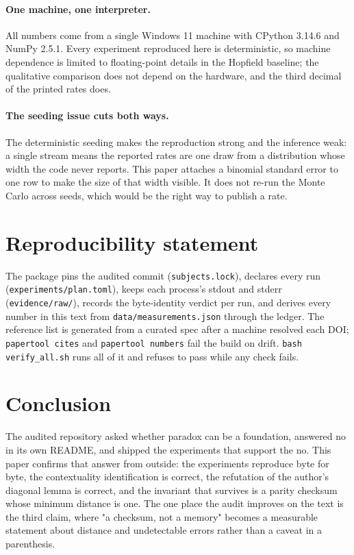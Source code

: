 \documentclass[11pt,a4paper]{article}
\begin{document}
\paragraph{One machine, one interpreter.} All numbers come from a single Windows 11 machine with
CPython 3.14.6 and NumPy 2.5.1. Every experiment reproduced here is deterministic, so machine
dependence is limited to floating-point details in the Hopfield baseline; the qualitative
comparison does not depend on the hardware, and the third decimal of the printed rates does.

\paragraph{The seeding issue cuts both ways.} The deterministic seeding makes the reproduction
strong and the inference weak: a single stream means the reported rates are one draw from a
distribution whose width the code never reports. This paper attaches a binomial standard error to
one row to make the size of that width visible. It does not re-run the Monte Carlo across seeds,
which would be the right way to publish a rate.

\section{Reproducibility statement}

The package pins the audited commit (\texttt{subjects.lock}), declares every run
(\texttt{experiments/\allowbreak{}plan.toml}), keeps each process's stdout and stderr (\texttt{evidence/\allowbreak{}raw/\allowbreak{}}),
records the byte-identity verdict per run, and derives every number in this text from
\texttt{data/\allowbreak{}measurements.json} through the ledger. The reference list is generated from a curated
spec after a machine resolved each DOI; \texttt{papertool cites} and \texttt{papertool numbers}
fail the build on drift. \texttt{bash verify\_\allowbreak{}all.sh} runs all of it and refuses to pass while any
check fails.

\section{Conclusion}

The audited repository asked whether paradox can be a foundation, answered no in its own README,
and shipped the experiments that support the no. This paper confirms that answer from outside: the
experiments reproduce byte for byte, the contextuality identification is correct, the refutation
of the author's diagonal lemma is correct, and the invariant that survives is a parity checksum
whose minimum distance is one. The one place the audit improves on the text is the third claim,
where "a checksum, not a memory" becomes a measurable statement about distance and undetectable
errors rather than a caveat in a parenthesis.
\end{document}
